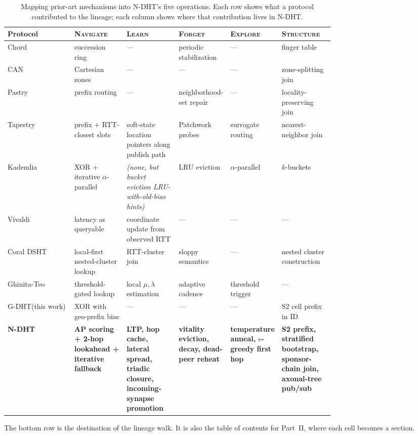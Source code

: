 \documentclass[twoside,nobib]{tufte-book}
\newcommand{\NDHT}{N-DHT\xspace}
\newcommand{\GDHT}{G-DHT\xspace}
\begin{document}
\begin{table}[h]
\centering
\small
\caption{Mapping prior-art mechanisms into \NDHT's five operations.
Each row shows what a protocol contributed to the lineage; each
column shows where that contribution lives in \NDHT.}
\label{tab:lineage-map}
\begin{tabular}{@{}lp{0.16\linewidth}p{0.16\linewidth}p{0.14\linewidth}p{0.13\linewidth}p{0.16\linewidth}@{}}
\toprule
\textbf{Protocol} &
\textbf{\textsc{Navigate}} &
\textbf{\textsc{Learn}} &
\textbf{\textsc{Forget}} &
\textbf{\textsc{Explore}} &
\textbf{\textsc{Structure}} \\
\midrule
Chord & succession ring & --- &
periodic stabilization & --- & finger table \\
CAN & Cartesian zones & --- & --- & --- &
zone-splitting join \\
Pastry & prefix routing & --- &
neighborhood-set repair & --- &
locality-preserving join \\
Tapestry & prefix + RTT-closest slots &
soft-state location pointers along publish path &
Patchwork probes &
surrogate routing &
nearest-neighbor join \\
Kademlia & XOR + iterative $\alpha$-parallel &
\emph{(none, but bucket eviction LRU-with-old-bias hints)} &
LRU eviction & $\alpha$-parallel &
$k$-buckets \\
Vivaldi & latency as queryable & coordinate update from observed RTT & --- & --- & --- \\
Coral DSHT & local-first nested-cluster lookup &
RTT-cluster join &
sloppy semantics & --- &
nested cluster construction \\
Ghinita-Teo &
threshold-gated lookup &
local $\mu, \lambda$ estimation &
adaptive cadence &
threshold trigger &
--- \\
\GDHT (this work) & XOR with geo-prefix bias & --- & --- & --- &
S2 cell prefix in ID \\
\midrule
\textbf{\NDHT} &
\textbf{AP scoring + 2-hop lookahead + iterative fallback} &
\textbf{LTP, hop cache, lateral spread, triadic closure,
incoming-synapse promotion} &
\textbf{vitality eviction, decay, dead-peer reheat} &
\textbf{temperature anneal, $\epsilon$-greedy first hop} &
\textbf{S2 prefix, stratified bootstrap, sponsor-chain join,
axonal-tree pub/sub} \\
\bottomrule
\end{tabular}
\end{table}

The bottom row is the destination of the lineage walk. It is also
the table of contents for Part~II, where each cell becomes a
section.
\end{document}
